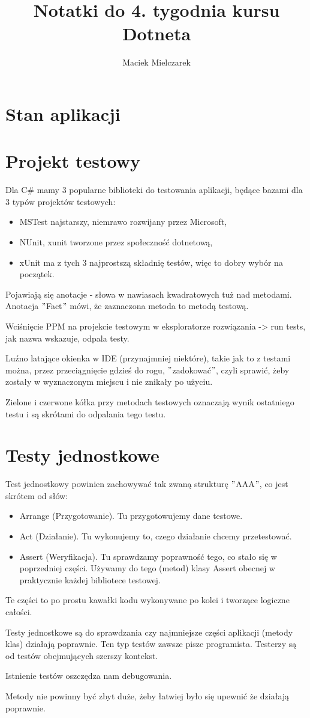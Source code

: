 \documentclass[10pt]{article}
\title{Notatki do 4. tygodnia kursu Dotneta}
\author{Maciek Mielczarek}
\begin{document}
\maketitle

\tableofcontents

\section{Stan aplikacji}


\section{Projekt testowy}
Dla C\# mamy 3 popularne biblioteki do testowania aplikacji, będące bazami dla 3 typów projektów testowych:
\begin{itemize}
\item MSTest najstarszy, niemrawo rozwijany przez Microsoft,
\item NUnit, xunit tworzone przez społeczność dotnetową,
\item xUnit ma z tych 3 najprostszą składnię testów, więc to dobry wybór na początek.
\end{itemize}

Pojawiają się anotacje - słowa w nawiasach kwadratowych tuż nad metodami. Anotacja $"$Fact$"$ mówi, że zaznaczona metoda to metodą testową.

Wciśnięcie PPM na projekcie testowym w eksploratorze rozwiązania -> run tests, jak nazwa wskazuje, odpala testy.

Luźno latające okienka w IDE (przynajmniej niektóre), takie jak to z testami można, przez przeciągnięcie gdzieś do rogu, $"$zadokować$"$, czyli sprawić, żeby zostały w wyznaczonym miejscu i nie znikały po użyciu.

Zielone i czerwone kółka przy metodach testowych oznaczają wynik ostatniego testu i są skrótami do odpalania tego testu.

\section{Testy jednostkowe}
Test jednostkowy powinien zachowywać tak zwaną strukturę $"$AAA$"$, co jest skrótem od słów:
\begin{itemize}
\item Arrange (Przygotowanie). Tu przygotowujemy dane testowe.
\item Act (Działanie). Tu wykonujemy to, czego działanie chcemy przetestować.
\item Assert (Weryfikacja). Tu sprawdzamy poprawność tego, co stało się w poprzedniej części. Używamy do tego (metod) klasy Assert obecnej w praktycznie każdej bibliotece testowej.
\end{itemize}
Te części to po prostu kawałki kodu wykonywane po kolei i tworzące logiczne całości.

Testy jednostkowe są do sprawdzania czy najmniejsze części aplikacji (metody klas) działają poprawnie. Ten typ testów zawsze pisze programista. Testerzy są od testów obejmujących szerszy kontekst.

Istnienie testów oszczędza nam debugowania.

Metody nie powinny być zbyt duże, żeby łatwiej było się upewnić że działają poprawnie.
\end{document}
